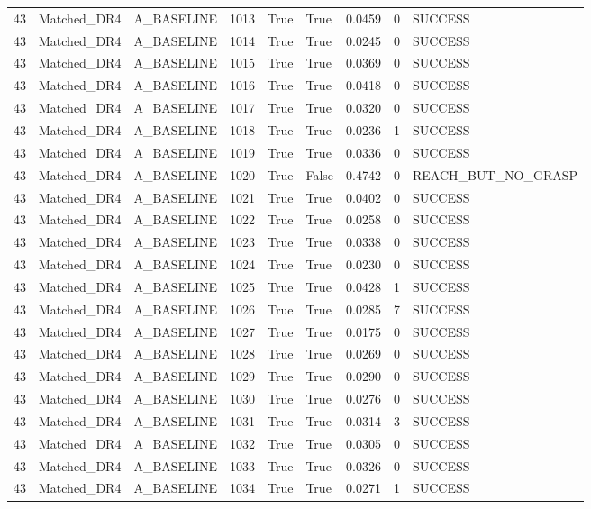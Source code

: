 \documentclass[11pt,a4paper,oneside]{book}
\begin{document}
\begin{longtable}{l l l l l l l l l}
43 & Matched\_DR4 & A\_BASELINE & 1013 & True & True & 0.0459 & 0 & SUCCESS \\
43 & Matched\_DR4 & A\_BASELINE & 1014 & True & True & 0.0245 & 0 & SUCCESS \\
43 & Matched\_DR4 & A\_BASELINE & 1015 & True & True & 0.0369 & 0 & SUCCESS \\
43 & Matched\_DR4 & A\_BASELINE & 1016 & True & True & 0.0418 & 0 & SUCCESS \\
43 & Matched\_DR4 & A\_BASELINE & 1017 & True & True & 0.0320 & 0 & SUCCESS \\
43 & Matched\_DR4 & A\_BASELINE & 1018 & True & True & 0.0236 & 1 & SUCCESS \\
43 & Matched\_DR4 & A\_BASELINE & 1019 & True & True & 0.0336 & 0 & SUCCESS \\
43 & Matched\_DR4 & A\_BASELINE & 1020 & True & False & 0.4742 & 0 & REACH\_BUT\_NO\_GRASP \\
43 & Matched\_DR4 & A\_BASELINE & 1021 & True & True & 0.0402 & 0 & SUCCESS \\
43 & Matched\_DR4 & A\_BASELINE & 1022 & True & True & 0.0258 & 0 & SUCCESS \\
43 & Matched\_DR4 & A\_BASELINE & 1023 & True & True & 0.0338 & 0 & SUCCESS \\
43 & Matched\_DR4 & A\_BASELINE & 1024 & True & True & 0.0230 & 0 & SUCCESS \\
43 & Matched\_DR4 & A\_BASELINE & 1025 & True & True & 0.0428 & 1 & SUCCESS \\
43 & Matched\_DR4 & A\_BASELINE & 1026 & True & True & 0.0285 & 7 & SUCCESS \\
43 & Matched\_DR4 & A\_BASELINE & 1027 & True & True & 0.0175 & 0 & SUCCESS \\
43 & Matched\_DR4 & A\_BASELINE & 1028 & True & True & 0.0269 & 0 & SUCCESS \\
43 & Matched\_DR4 & A\_BASELINE & 1029 & True & True & 0.0290 & 0 & SUCCESS \\
43 & Matched\_DR4 & A\_BASELINE & 1030 & True & True & 0.0276 & 0 & SUCCESS \\
43 & Matched\_DR4 & A\_BASELINE & 1031 & True & True & 0.0314 & 3 & SUCCESS \\
43 & Matched\_DR4 & A\_BASELINE & 1032 & True & True & 0.0305 & 0 & SUCCESS \\
43 & Matched\_DR4 & A\_BASELINE & 1033 & True & True & 0.0326 & 0 & SUCCESS \\
43 & Matched\_DR4 & A\_BASELINE & 1034 & True & True & 0.0271 & 1 & SUCCESS \\

\end{longtable}
\end{document}
